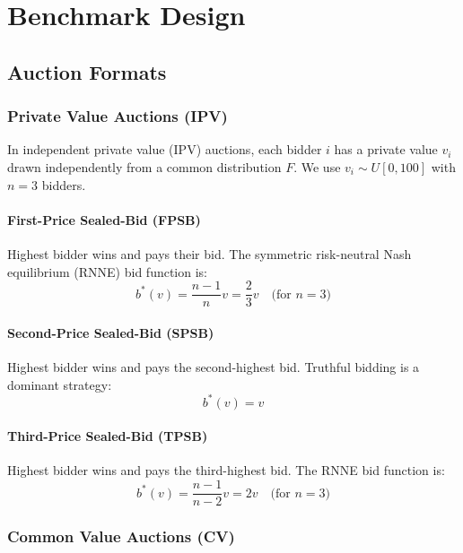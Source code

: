 \documentclass[12pt]{article}
\begin{document}
\section{Benchmark Design}

\subsection{Auction Formats}

\subsubsection{Private Value Auctions (IPV)}

In independent private value (IPV) auctions, each bidder $i$ has a private value $v_i$ drawn independently from a common distribution $F$. We use $v_i \sim U[0, 100]$ with $n=3$ bidders.

\paragraph{First-Price Sealed-Bid (FPSB)} Highest bidder wins and pays their bid. The symmetric risk-neutral Nash equilibrium (RNNE) bid function is:
\begin{equation}
    b^*(v) = \frac{n-1}{n} v = \frac{2}{3} v \quad \text{(for } n=3 \text{)}
\end{equation}

\paragraph{Second-Price Sealed-Bid (SPSB)} Highest bidder wins and pays the second-highest bid. Truthful bidding is a dominant strategy:
\begin{equation}
    b^*(v) = v
\end{equation}

\paragraph{Third-Price Sealed-Bid (TPSB)} Highest bidder wins and pays the third-highest bid. The RNNE bid function is:
\begin{equation}
    b^*(v) = \frac{n-1}{n-2} v = 2v \quad \text{(for } n=3 \text{)}
\end{equation}

\subsubsection{Common Value Auctions (CV)}
\end{document}
